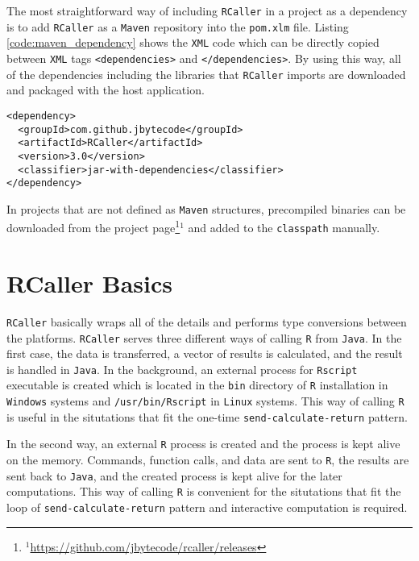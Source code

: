 \documentclass[10pt,a4paper, final, oneside]{article}
\begin{document}
The most straightforward way of including \texttt{RCaller} in a project as a dependency is to add \texttt{RCaller} as a \texttt{Maven} repository into the \texttt{pom.xlm} file. Listing \ref{code:maven_dependency} shows the \texttt{XML} code which can be directly copied between \texttt{XML} tags \texttt{<dependencies>} and \texttt{</dependencies>}. By using this way, all of the dependencies including the libraries that \texttt{RCaller} imports are downloaded and packaged with the host application.  


\begin{minipage}{\linewidth}
\begin{lstlisting}[caption=Maven dependency code, label=code:maven_dependency]
<dependency>
  <groupId>com.github.jbytecode</groupId>
  <artifactId>RCaller</artifactId>
  <version>3.0</version>
  <classifier>jar-with-dependencies</classifier>
</dependency>
\end{lstlisting}
\end{minipage}

In projects that are not defined as \texttt{Maven} structures, precompiled binaries can be downloaded from the project page\footnote{$^1$\url{https://github.com/jbytecode/rcaller/releases}}$^1$ and added to the \texttt{classpath} manually. 

\section{RCaller Basics}
\label{sec:rcaller_basics}

\texttt{RCaller} basically wraps all of the details and performs type conversions between the platforms. \texttt{RCaller} serves three different ways of calling \texttt{R} from \texttt{Java}. In the first case, the data is transferred, a vector of results is calculated, and the result is handled in \texttt{Java}. In the background, an external process for \texttt{Rscript} executable is created which is located in the \texttt{bin} directory of \texttt{R} installation in \texttt{Windows} systems and \texttt{/usr/bin/Rscript} in \texttt{Linux} systems. This way of calling \texttt{R} is useful in the situtations that fit the one-time \texttt{send-calculate-return} pattern.

In the second way, an external \texttt{R} process is created and the process is kept alive on the memory. Commands, function calls, and data are sent to \texttt{R}, the results are sent back to \texttt{Java}, and the created process is kept alive for the later computations. This way of calling \texttt{R} is convenient for the situtations that fit the loop of \texttt{send-calculate-return} pattern and interactive computation is required. 
\end{document}
